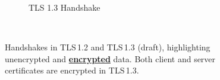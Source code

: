 \begin{figure}
\begin{subfigure}{0.48\textwidth}
{
}
\caption{TLS 1.3 Handshake}
\label{fig:tls13tikz}
\end{subfigure}\\
\caption{Handshakes in TLS\,1.2 and TLS\,1.3 (draft), highlighting unencrypted and \textcolor{TUMBlue}{\underline{\textbf{encrypted}}} data. Both client and server certificates are encrypted in TLS\,1.3.}
\vspace{-1em}
\end{figure}
